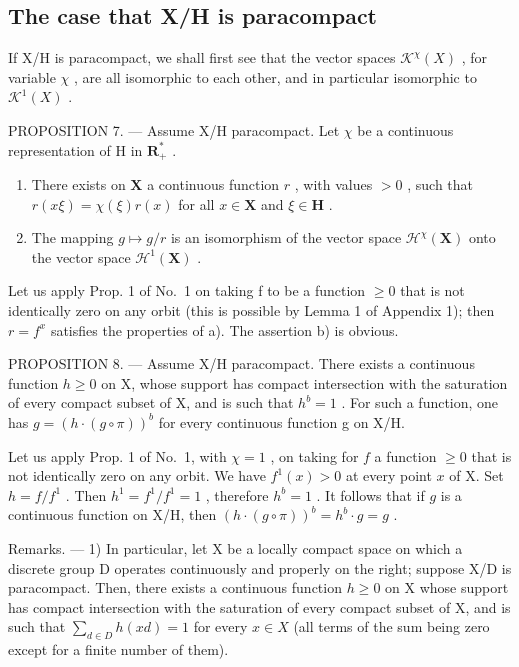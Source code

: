 \subsection{The case that X/H is paracompact}

If X/H is paracompact, we shall first see that the vector spaces \(\mathcal{K}^{\chi}(X)\) , for variable \(\chi\) , are all isomorphic to each other, and in particular isomorphic to \(\mathcal{K}^{1}(X)\) .

PROPOSITION 7. --- Assume X/H paracompact. Let \(\chi\) be a continuous representation of H in \(\mathbf{R}_{+}^{*}\) .

\begin{enumerate}
\def\labelenumi{\alph{enumi})}
\item
  There exists on \(\mathbf{X}\) a continuous function \(r\) , with values \(>0\) , such that \(r(x\xi) = \chi (\xi)r(x)\) for all \(x\in \mathbf{X}\) and \(\xi \in \mathbf{H}\) .
\item
  The mapping \(g \mapsto g / r\) is an isomorphism of the vector space \(\mathcal{H}^{\chi}(\mathbf{X})\) onto the vector space \(\mathcal{H}^{1}(\mathbf{X})\) .
\end{enumerate}

Let us apply Prop. 1 of No.~1 on taking f to be a function \(\geqslant0\) that is not identically zero on any orbit (this is possible by Lemma 1 of Appendix 1); then \(r = f^{x}\) satisfies the properties of a). The assertion b) is obvious.

PROPOSITION 8. --- Assume X/H paracompact. There exists a continuous function \(h \geqslant 0\) on X, whose support has compact intersection with the saturation of every compact subset of X, and is such that \(h^{b}=1\) . For such a function, one has \(g=\left(h\cdot(g\circ\pi)\right)^{b}\) for every continuous function g on X/H.

Let us apply Prop. 1 of No.~1, with \(\chi = 1\) , on taking for \(f\) a function \(\geqslant 0\) that is not identically zero on any orbit. We have \(f^1(x) > 0\) at every point \(x\) of X. Set \(h = f / f^1\) . Then \(h^1 = f^1 / f^1 = 1\) , therefore \(h^b = 1\) . It follows that if \(g\) is a continuous function on X/H, then \(\left(h \cdot (g \circ \pi)\right)^b = h^b \cdot g = g\) .

Remarks. --- 1) In particular, let X be a locally compact space on which a discrete group D operates continuously and properly on the right; suppose X/D is paracompact. Then, there exists a continuous function \(h \geqslant 0\) on X whose support has compact intersection with the saturation of every compact subset of X, and is such that \(\sum_{d \in D} h(x d) = 1\) for every \(x \in X\) (all terms of the sum being zero except for a finite number of them).


